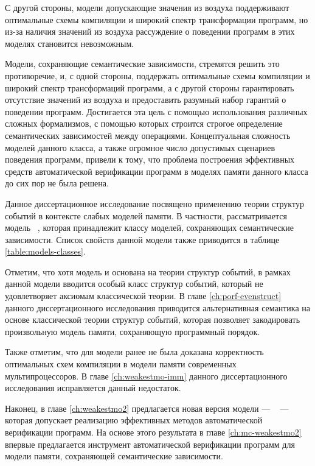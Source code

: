 С другой стороны, модели допускающие значения из воздуха 
поддерживают оптимальные схемы компиляции и широкий спектр 
трансформации программ, но из-за наличия значений из воздуха 
рассуждение о поведении программ в этих моделях становится невозможным. 

Модели, сохраняющие семантические зависимости, стремятся 
решить это противоречие, и, с одной стороны, 
поддержать оптимальные схемы компиляции и широкий спектр 
трансформаций программ, а с другой стороны 
гарантировать отсутствие значений из воздуха 
и предоставить разумный набор гарантий о поведении программ.
Достигается эта цель с помощью использования различных 
сложных формализмов, с помощью которых строится строгое определение
семантических зависимостей между операциями.
Концептуальная сложность моделей данного класса, 
а также огромное число допустимых сценариев поведения программ,
привели к тому, что проблема построения эффективных 
средств автоматической верификации программ в 
моделях памяти данного класса до сих пор не была решена. 

Данное диссертационное исследование посвящено 
применению теории структур событий в контексте слабых моделей памяти. 
В частности, рассматривается модель \Wkm~\cite{Chakraborty-Vafeiadis:POPL19}, 
которая принадлежит классу моделей, сохраняющих семантические зависимости. 
Список свойств данной модели также приводится в таблице \ref{table:models-classes}.

Отметим, что хотя модель \Wkm и основана на 
теории структур событий, в рамках данной модели 
вводится особый класс структур событий, 
который не удовлетворяет аксиомам классической теории.
В главе \ref{ch:porf-evenstruct} данного диссертационного исследования 
приводится альтернативная семантика на основе 
классической теории структур событий,  
которая позволяет закодировать произвольную 
модель памяти, сохраняющую программный порядок.

Также отметим, что для модели \Wkm ранее не была 
доказана корректность оптимальных схем компиляции 
в модели памяти современных мультипроцессоров. 
В главе \ref{ch:weakestmo-imm} данного диссертационного исследования 
исправляется данный недостаток. 

Наконец, в главе \ref{ch:weakestmo2} предлагается новая версия модели \Wkm --- 
\WkmS~ --- которая допускает реализацию эффективных методов 
автоматической верификации программ.
На основе этого результата в главе \ref{ch:mc-weakestmo2} 
впервые предлагается инструмент 
автоматической верификации программ для модели памяти, 
сохраняющей семантические зависимости.  

